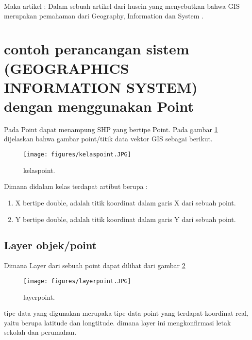 \begin{enumerate}
Maka artikel :
	Dalam sebuah artikel dari husein yang menyebutkan bahwa  GIS merupakan pemahaman dari
	Geography, Information dan System \cite{widiatmoko2009aplikasi}.

\section{contoh perancangan sistem (GEOGRAPHICS INFORMATION SYSTEM) dengan menggunakan Point}
Pada Point dapat menampung SHP yang bertipe Point.
Pada gambar \ref{kelaspoint} dijelaskan bahwa gambar point/titik data vektor GIS sebagai berikut.
\begin{figure}[ht]
	\centerline{\texttt{[image: figures/kelaspoint.JPG]}}
	\caption{kelaspoint.}
	\label{kelaspoint}
	\end{figure}
Dimana didalam kelas terdapat artibut berupa :
\begin{enumerate}
\item X bertipe double, adalah titik koordinat dalam garis X dari sebuah point.
\item Y bertipe double, adalah titik koordinat dalam garis Y dari sebuah point.
\end{enumerate}
\subsection{Layer objek/point}
Dimana Layer dari sebuah point dapat dilihat dari gambar \ref{layerpoint}
 \begin{figure}[ht]
	\centerline{\texttt{[image: figures/layerpoint.JPG]}}
	\caption{layerpoint.}
	\label{layerpoint}
	\end{figure}
tipe data yang digunakan merupaka tipe data point yang terdapat koordinat real, yaitu berupa latitude dan longtitude. dimana layer ini mengkonfirmasi letak sekolah dan perumahan.


\end{enumerate}
